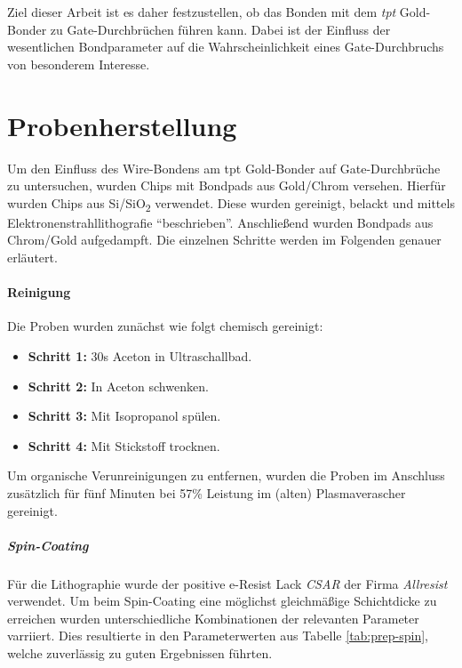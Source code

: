 \documentclass[
  paper=a4,
  ,captions=tableheading
]{scrartcl}
\providecommand{\tightlist}{%
  \setlength{\itemsep}{0pt}\setlength{\parskip}{0pt}}
\begin{document}
Ziel dieser Arbeit ist es daher festzustellen, ob das Bonden mit dem \emph{tpt} Gold-Bonder zu Gate-Durchbrüchen führen kann. Dabei ist der Einfluss der wesentlichen Bondparameter auf die Wahrscheinlichkeit eines Gate-Durchbruchs von besonderem Interesse.

\hypertarget{sample-prep}{%
\section{Probenherstellung}\label{sample-prep}}

Um den Einfluss des Wire-Bondens am tpt Gold-Bonder auf Gate-Durchbrüche zu untersuchen, wurden Chips mit Bondpads aus Gold/Chrom versehen. Hierfür wurden Chips aus Si/SiO\textsubscript{2} verwendet. Diese wurden gereinigt, belackt und mittels Elektronenstrahllithografie \enquote{beschrieben}. Anschließend wurden Bondpads aus Chrom/Gold aufgedampft. Die einzelnen Schritte werden im Folgenden genauer erläutert.

\hypertarget{reinigung}{%
\paragraph{Reinigung}\label{reinigung}}

Die Proben wurden zunächst wie folgt chemisch gereinigt:

\begin{itemize}
\tightlist
\item
  \textbf{Schritt 1:} 30s Aceton in Ultraschallbad.
\item
  \textbf{Schritt 2:} In Aceton schwenken.
\item
  \textbf{Schritt 3:} Mit Isopropanol spülen.
\item
  \textbf{Schritt 4:} Mit Stickstoff trocknen.
\end{itemize}

Um organische Verunreinigungen zu entfernen, wurden die Proben im Anschluss zusätzlich für fünf Minuten bei 57\% Leistung im (alten) Plasmaverascher gereinigt.

\hypertarget{spin-coating}{%
\subparagraph{Spin-Coating}\label{spin-coating}}

Für die Lithographie wurde der positive e-Resist Lack \emph{CSAR} der Firma \emph{Allresist} verwendet. Um beim Spin-Coating eine möglichst gleichmäßige Schichtdicke zu erreichen wurden unterschiedliche Kombinationen der relevanten Parameter varriiert. Dies resultierte in den Parameterwerten aus Tabelle \ref{tab:prep-spin}, welche zuverlässig zu guten Ergebnissen führten.
\end{document}
